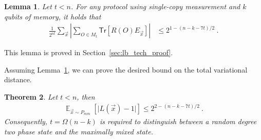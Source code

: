 \documentclass[11pt]{article}
\newtheorem{theorem}{Theorem}[section]
\newtheorem{lemma}[theorem]{Lemma}
\newcommand{\E}{\mathop{\mathbb{E}}}
\newcommand{\Tr}{\mathsf{Tr}}
\begin{document}
\begin{lemma}\label{lem:mt_bound}
    Let $t < n$. For any protocol using single-copy measurement and $k$ qubits of memory, it holds that
    \begin{align}
        \frac{1}{2^{nt}}\sum_{\vec{x}}\left\vert \sum_{O \in M_t}\Tr[R(O)E_{\vec{x}}] \right\vert & \leq 2^{1-(n-k-7t)/2}\ .
    \end{align}
\end{lemma}
This lemma is proved in Section~\ref{sec:lb_tech_proof}.

Assuming Lemma~\ref{lem:mt_bound}, we can prove the desired bound on the total variational distance.
\begin{theorem}\label{thm{lb_tv}}
    Let $t < n$, then
    \begin{align}
        \E_{\vec{x}\sim P_{mm}}[\vert L(\vec{x})-1\vert] \leq 2^{2-(n-k-7t)/2}\ .
    \end{align}
    Consequently, $t=\Omega(n-k)$ is required to distinguish between a random degree two phase state and the maximally mixed state.
\end{theorem}
\end{document}
